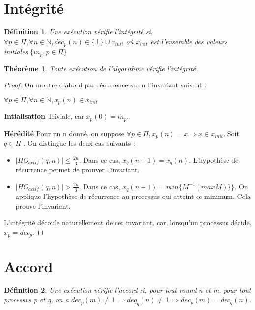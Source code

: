 \documentclass{article}
\newtheorem{theorem}{Théorème}
\newtheorem{definition}{Définition}
\begin{document}
\section{Intégrité}

\begin{definition}
	Une exécution vérifie l'intégrité si, $\forall p \in \Pi, \forall n \in \mathds{N}, dec_p(n) \in \{ \bot \} \cup x_{init}$
	où $x_{init}$ est l'ensemble des valeurs initiales $\{ in_p, p \in \Pi \}$
\end{definition}

\begin{theorem}
	Toute exécution de l'algorithme vérifie l'intégrité.
\end{theorem}
\begin{proof}
On montre d'abord par récurrence sur n l'invariant suivant : 

	$ \forall p \in \Pi, \forall n \in \mathds{N}, x_p(n) \in x_{init}$

\textbf{Intialisation}
Triviale, car $x_p(0) = in_p$. 

\textbf{Hérédité}
	Pour un n donné, on suppose $\forall p \in \Pi, x_p(n) = x \Rightarrow x \in x_{init}$.
Soit $q \in \Pi$ . On distingue les deux cas suivants :
\begin{itemize}

\item $|HO_{actif} (q, n) | \leq \frac{2n}{3}$. Dans ce cas, $x_q(n+1) = x_q(n)$. L'hypothèse de récurrence permet de prouver l'invariant.
\item $|HO_{actif} (q, n) | > \frac{2n}{3}$. Dans ce cas, $x_q(n+1) = min \{M^{-1} (max M)\}\}$. On applique l'hypothèse de récurrence au processus qui atteint ce minimum. Cela prouve l'invariant.

\end{itemize}

L'intégrité découle naturellement de cet invariant, car, lorsqu'un processus décide, $x_p = dec_p$.
\end{proof}

\section{Accord}

\begin{definition}
	Une exécution vérifie l'accord si, pour tout round n et m, pour tout processus p et q, on a $dec_p(m) \neq \bot \Rightarrow deq_q(n) \neq \bot \Rightarrow dec_p(m) = dec_q(n)$.
\end{definition}
\end{document}

